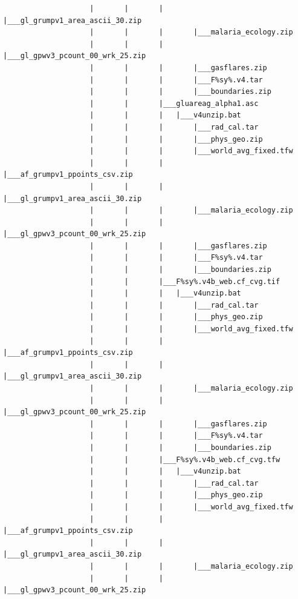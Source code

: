 \documentclass[]{book}
\begin{document}
\begin{verbatim}
                    |       |       |       |___gl_grumpv1_area_ascii_30.zip
                    |       |       |       |___malaria_ecology.zip
                    |       |       |       |___gl_gpwv3_pcount_00_wrk_25.zip
                    |       |       |       |___gasflares.zip
                    |       |       |       |___F%sy%.v4.tar
                    |       |       |       |___boundaries.zip
                    |       |       |___gluareag_alpha1.asc
                    |       |       |   |___v4unzip.bat
                    |       |       |       |___rad_cal.tar
                    |       |       |       |___phys_geo.zip
                    |       |       |       |___world_avg_fixed.tfw
                    |       |       |       |___af_grumpv1_ppoints_csv.zip
                    |       |       |       |___gl_grumpv1_area_ascii_30.zip
                    |       |       |       |___malaria_ecology.zip
                    |       |       |       |___gl_gpwv3_pcount_00_wrk_25.zip
                    |       |       |       |___gasflares.zip
                    |       |       |       |___F%sy%.v4.tar
                    |       |       |       |___boundaries.zip
                    |       |       |___F%sy%.v4b_web.cf_cvg.tif
                    |       |       |   |___v4unzip.bat
                    |       |       |       |___rad_cal.tar
                    |       |       |       |___phys_geo.zip
                    |       |       |       |___world_avg_fixed.tfw
                    |       |       |       |___af_grumpv1_ppoints_csv.zip
                    |       |       |       |___gl_grumpv1_area_ascii_30.zip
                    |       |       |       |___malaria_ecology.zip
                    |       |       |       |___gl_gpwv3_pcount_00_wrk_25.zip
                    |       |       |       |___gasflares.zip
                    |       |       |       |___F%sy%.v4.tar
                    |       |       |       |___boundaries.zip
                    |       |       |___F%sy%.v4b_web.cf_cvg.tfw
                    |       |       |   |___v4unzip.bat
                    |       |       |       |___rad_cal.tar
                    |       |       |       |___phys_geo.zip
                    |       |       |       |___world_avg_fixed.tfw
                    |       |       |       |___af_grumpv1_ppoints_csv.zip
                    |       |       |       |___gl_grumpv1_area_ascii_30.zip
                    |       |       |       |___malaria_ecology.zip
                    |       |       |       |___gl_gpwv3_pcount_00_wrk_25.zip

\end{verbatim}
\end{document}
